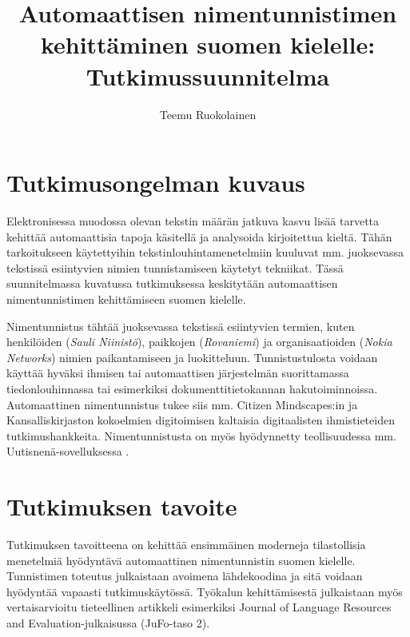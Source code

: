 \documentclass[12pt,a4paper,finnish,oneside]{article}
\begin{document}
\title{Automaattisen nimentunnistimen kehittäminen suomen kielelle: Tutkimussuunnitelma}
\author{Teemu Ruokolainen}


\maketitle


\section{Tutkimusongelman kuvaus}

Elektronisessa muodossa olevan tekstin määrän jatkuva kasvu lisää tarvetta kehittää automaattisia tapoja käsitellä ja analysoida kirjoitettua kieltä. Tähän tarkoitukseen käytettyihin tekstinlouhintamenetelmiin kuuluvat mm. juoksevassa tekstissä esiintyvien nimien tunnistamiseen käytetyt tekniikat. Tässä suunnitelmassa kuvatussa tutkimuksessa keskitytään automaattisen nimentunnistimen kehittämiseen suomen kielelle. 


Nimentunnistus tähtää juoksevassa tekstissä esiintyvien termien, kuten henkilöiden (\textit{Sauli Niinistö}), paikkojen (\textit{Rovaniemi}) ja organisaatioiden (\textit{Nokia Networks}) nimien paikantamiseen ja luokitteluun. Tunnistustulosta voidaan käyttää hyväksi ihmisen tai automaattisen järjestelmän suorittamassa tiedonlouhinnassa tai esimerkiksi dokumenttitietokannan hakutoiminnoissa. Automaattinen nimentunnistus tukee siis mm. Citizen Mindscapes:in \cite{citizenmindscapes} ja Kansalliskirjaston kokoelmien digitoimisen \cite{kansalliskirjasto} kaltaisia digitaalisten ihmistieteiden tutkimushankkeita. Nimentunnistusta on myös hyödynnetty teollisuudessa mm. Uutisnenä-sovelluksessa \cite{huovelin2013}.


\section{Tutkimuksen tavoite}

Tutkimuksen tavoitteena on kehittää ensimmäinen moderneja tilastollisia menetelmiä hyödyntävä automaattinen nimentunnistin suomen kielelle. Tunnistimen toteutus julkaistaan avoimena lähdekoodina ja sitä voidaan hyödyntää vapaasti tutkimuskäytössä. Työkalun kehittämisestä julkaistaan myös vertaisarvioitu tieteellinen artikkeli esimerkiksi Journal of Language Resources and Evaluation-julkaisussa (JuFo-taso 2).
\end{document}
